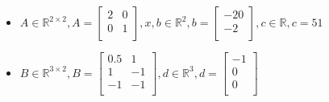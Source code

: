 \documentclass[12pt]{article}
\begin{document}
\begin{itemize}
  \item $A \in \mathbb{R}^{2 \times 2}, A = \begin{bmatrix}
               2 & 0 \\
               0 & 1 \\
  \end{bmatrix}, x,b \in \mathbb{R}^{2}, b = \begin{bmatrix}   -20 \\ -2\\ \end{bmatrix}, c \in \mathbb{R}, c= 51$ 
  \item $B \in \mathbb{R}^{3 \times 2}, B = \begin{bmatrix}
               0.5 & 1 \\
               1 & -1 \\
               -1 & -1 \\
  \end{bmatrix}, d \in \mathbb{R}^{3}, d = \begin{bmatrix}   -1 \\ 0\\ 0\\\end{bmatrix}$
\end{itemize}
\end{document}
